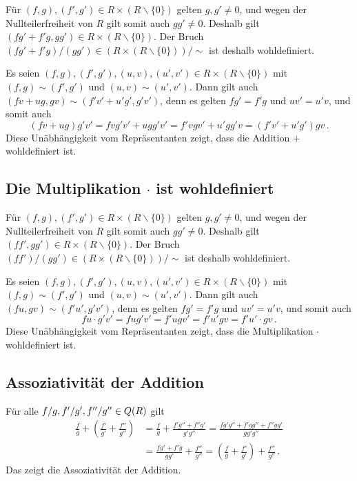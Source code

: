 Für $(f,g), (f', g') \in R \times (R \smallsetminus\{0\})$ gelten $g, g' \neq 0$, und wegen der Nullteilerfreiheit von $R$ gilt somit auch $g g' \neq 0$.
Deshalb gilt $(f g' + f' g, g g') \in R \times (R \smallsetminus\{0\})$.
Der Bruch $(f g' + f' g)/(g g') \in (R \times (R \smallsetminus\{0\}))/{\sim}$ ist deshalb wohldefiniert.

Es seien $(f,g), (f', g'), (u, v), (u', v') \in R \times (R \smallsetminus\{0\})$ mit $(f, g) \sim (f', g')$ und $(u,v) \sim (u',v')$.
Dann gilt auch $(f v + u g, g v) \sim (f' v' + u' g', g' v')$, denn es gelten $f g' = f' g$ und $u v' = u' v$, und somit auch
\[
    (f v + u g) g' v'
  = f v g' v' + u g g' v'
  = f' v g v' + u' g g' v
  = (f' v' + u' g') g v \,.
\]
Diese Unäbhängigkeit vom Repräsentanten zeigt, dass die Addition $+$ wohldefiniert ist.





\subsection*{Die Multiplikation $\cdot$ ist wohldefiniert}

Für $(f,g), (f', g') \in R \times (R \smallsetminus\{0\})$ gelten $g, g' \neq 0$, und wegen der Nullteilerfreiheit von $R$ gilt somit auch $g g ' \neq 0$.
Deshalb gilt $(f f', g g') \in R \times (R \smallsetminus\{0\})$.
Der Bruch $(ff')/(gg') \in (R \times (R \smallsetminus\{0\}))/{\sim}$ ist deshalb wohldefiniert.

Es seien $(f,g), (f', g'), (u, v), (u', v') \in R \times (R \smallsetminus\{0\})$ mit $(f, g) \sim (f', g')$ und $(u,v) \sim (u',v')$.
Dann gilt auch $(f u, g v ) \sim (f' u', g' v')$, denn es gelten $f g' = f' g$ und $u v' = u' v$, und somit auch
\[
      f u \cdot g' v'
    = f u g' v'
    = f' u g v'
    = f' u' g v
    = f' u' \cdot g v \,.
\]
Diese Unäbhängigkeit vom Repräsentanten zeigt, dass die Multiplikation $\cdot$ wohldefiniert ist.





\subsection*{Assoziativität der Addition}

Für alle $f/g, f'/g', f''/g'' \in Q(R)$ gilt
\begin{align*}
      \frac{f}{g} + \left( \frac{f'}{g'} + \frac{f''}{g''} \right)
  &=  \frac{f}{g} + \frac{f' g'' + f'' g'}{g' g''}
   =  \frac{f g' g'' + f' g g'' + f'' g g'}{g g' g''} \\
  &=  \frac{f g' + f' g}{g g'} + \frac{f''}{g''}
   =  \left( \frac{f}{g} + \frac{f'}{g'} \right) + \frac{f''}{g''} \,.
\end{align*}
Das zeigt die Assoziativität der Addition.





